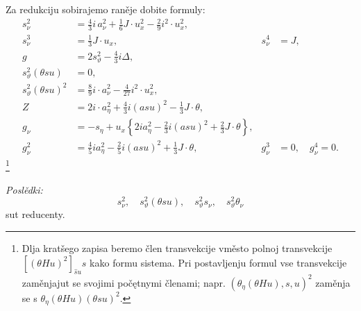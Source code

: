 \documentclass[11pt]{article}
\begin{document}
Za redukciju sobirajemo raněje dobite formuly:
\[
\tag{24}
\begin{aligned}
s_{\nu}^2&=\frac43i\,a_{\nu}^2+\frac16J\cdot u_x^2-\frac29i^2\cdot u_x^2,\\
s_{\nu}^3&=\frac13J\cdot u_x,
& s_{\nu}^4&=J,\\
g&=2s_\vartheta^2-\frac43i\Delta,\\
s_\vartheta^2(\theta su)&=0,\\
s_\vartheta^2(\theta su)^2&=\frac89i\cdot a_{\nu}^2-\frac4{27}i^2\cdot u_x^2,\\
Z&=2i\cdot a_\eta^2+\frac43i(asu)^2-\frac13J\cdot\theta,\\
g_{\nu}&=-s_\eta+u_x\left\{2ia_\eta^2-\frac23i(asu)^2+\frac23J\cdot\theta\right\},\\
g_{\nu}^2&=\frac45ia_\eta^2-\frac25i(asu)^2+\frac13J\cdot\theta,
&g_{\nu}^3&=0,\quad g_{\nu}^4=0.
\end{aligned}
\]
\footnote{Dlja kratšego zapisa beremo člen transvekcije vměsto polnoj transvekcije $[(\theta Hu)^2]_{\widehat{s}u}s$ kako formu sistema. Pri postavljenju formul vse transvekcije zaměnjajut se svojimi počętnymi členami; napr. $(\theta_\eta(\theta Hu),s,u)^2$ zaměnja se s $\theta_\eta(\theta Hu)(\theta su)^2$.}

\noindent\textit{Poslědki:}
\[
 s_{\nu}^2,\quad s_\vartheta^2(\theta su),\quad s_\vartheta^2s_{\nu},\quad s_\vartheta^2\theta_{\nu}
\]
sut reducenty.
\end{document}
